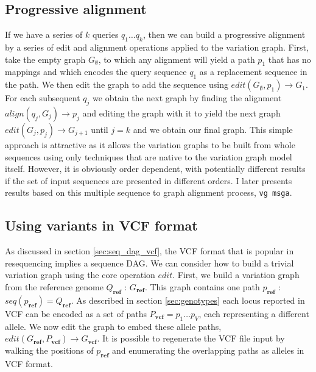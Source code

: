 \subsection{Progressive alignment}

If we have a series of $k$ queries $q_1 \ldots q_k$, then we can build a progressive alignment by a series of edit and alignment operations applied to the variation graph.
First, take the empty graph $G_\emptyset$, to which any alignment will yield a path $p_1$ that has no mappings and which encodes the query sequence $q_1$ as a replacement sequence in the path.
We then edit the graph to add the sequence using $edit(G_\emptyset, p_1) \to G_1$.
For each subsequent $q_j$ we obtain the next graph by finding the alignment $align(q_j, G_j) \to p_j$ and editing the graph with it to yield the next graph $edit(G_j, p_j) \to G_{j+1}$ until $j = k$ and we obtain our final graph.
This simple approach is attractive as it allows the variation graphs to be built from whole sequences using only techniques that are native to the variation graph model itself.
However, it is obviously order dependent, with potentially different results if the set of input sequences are presented in different orders.
I later presents results based on this multiple sequence to graph alignment process, {\tt vg msga}.

\subsection{Using variants in VCF format}
As discussed in section \ref{sec:seq_dag_vcf}, the VCF format that is popular in resequencing implies a sequence DAG.
We can consider how to build a trivial variation graph using the core operation $edit$.
First, we build a variation graph from the reference genome $Q_\textbf{ref}$ : $G_\textbf{ref}$.
This graph contains one path $p_\textbf{ref}$ : $seq(p_\textbf{ref}) = Q_\textbf{ref}$.
As described in section \ref{sec:genotypes} each locus reported in VCF can be encoded as a set of paths $P_\textbf{vcf} = p_1 \ldots p_V$, each representing a different allele.
We now edit the graph to embed these allele paths, $edit(G_\textbf{ref}, P_\textbf{vcf}) \to G_\textbf{vcf}$.
It is possible to regenerate the VCF file input by walking the positions of $p_\textbf{ref}$ and enumerating the overlapping paths as alleles in VCF format.

